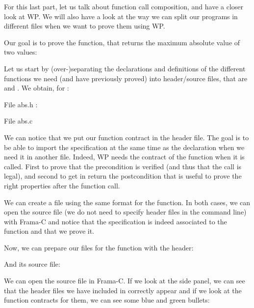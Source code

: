 For this last part, let us talk about function call composition,
and have a closer look at WP. We will also have a look at the way we can split
our programs in different files when we want to prove them using WP.

Our goal is to prove the  function, that returns
the maximum absolute value of two values:






Let us start by (over-)separating the declarations and definitions of the
different functions we need (and have previously proved) into header/source
files, that are  and . We obtain, for
:



File abs.h :




File abs.c




We can notice that we put our function contract in the header file.
The goal is to be able to import the specification at the same time as
the declaration when we need it in another file. Indeed, WP needs the
contract of the function when it is called. First to prove that the
precondition is verified (and thus that the call is legal), and second
to get in return the postcondition that is useful to prove the right
properties after the function call.

We can create a file using the same format for the 
function. In both cases, we can open the source file (we do not need to
specify header files in the command line) with Frama-C and notice that
the specification is indeed associated to the function and that we prove
it.


Now, we can prepare our files for the  function with
the header:






And its source file:






We can open the source file in Frama-C. If we look at the side panel, we
can see that the header files we have included in 
correctly appear and if we look at the function contracts for them, we
can see some blue and green bullets:



